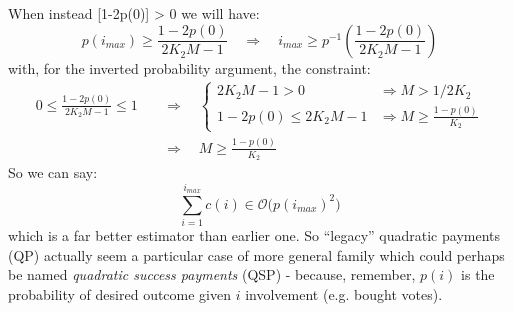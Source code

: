 \documentclass[10pt,a4paper]{article}
\begin{document}
	When instead [1-2p(0)] > 0 we will have:
	\begin{equation*}
		p(i_{max}) \geq \frac{1-2p(0)}{2K_{2}M-1} \quad \Longrightarrow \quad i_{max} \geq p^{-1}\left( \frac{1-2p(0)}{2K_{2}M-1} \right)
	\end{equation*}
	with, for the inverted probability argument, the constraint:
	\begin{align*}
		0 \leq \frac{1-2p(0)}{2K_{2}M-1} \leq 1 \quad &\Longrightarrow \quad
		\begin{cases}
			2K_{2}M-1 > 0 &\Longrightarrow M > 1/2K_{2}\\
			1-2p(0) \leq 2K_{2}M-1 &\Longrightarrow M \geq \displaystyle\frac{1-p(0)}{K_{2}}
		\end{cases}\\
		&\Longrightarrow \quad M \geq \displaystyle\frac{1-p(0)}{K_{2}}
	\end{align*}	
	So we can say:
	\begin{equation*}
		\sum_{i=1}^{i_{max}} c(i) \in \mathcal{O}\big(p(i_{max})^2\big)
	\end{equation*}
	which is a far better estimator than earlier one. So \enquote{legacy} quadratic payments (QP) actually seem a particular case of more general family which could perhaps be named \textit{quadratic success payments} (QSP) - because, remember, $p(i)$ is the probability of desired outcome given $i$ involvement (e.g. bought votes).
	
\end{document}
